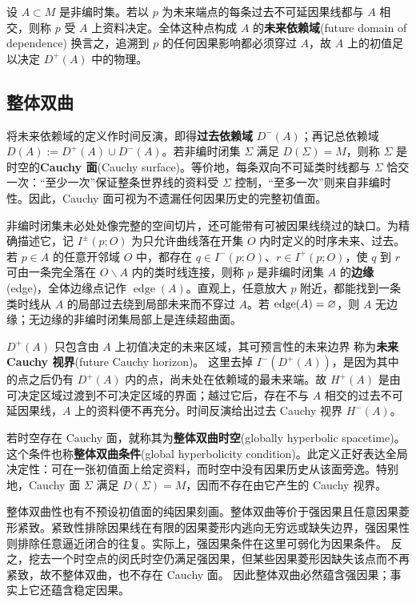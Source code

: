 设 $A\subset M$ 是非编时集。若以 $p$ 为未来端点的每条过去不可延因果线都与 $A$ 相交，则称 $p$ 受 $A$ 上资料决定。全体这种点构成 $A$ 的\textbf{未来依赖域}(future domain of dependence)
换言之，追溯到 $p$ 的任何因果影响都必须穿过 $A$，故 $A$ 上的初值足以决定 $D^+(A)$ 中的物理。

\subsection{整体双曲}

将未来依赖域的定义作时间反演，即得\textbf{过去依赖域} $D^-(A)$；再记总依赖域 $D(A):=D^+(A)\cup D^-(A)$。若非编时闭集 $\Sigma$ 满足 $D(\Sigma)=M$，则称 $\Sigma$ 是时空的\textbf{Cauchy 面}(Cauchy surface)。等价地，每条双向不可延类时线都与 $\Sigma$ 恰交一次：“至少一次”保证整条世界线的资料受 $\Sigma$ 控制，“至多一次”则来自非编时性。因此，Cauchy 面可视为不遗漏任何因果历史的完整初值面。

非编时闭集未必处处像完整的空间切片，还可能带有可被因果线绕过的缺口。为精确描述它，记 $I^\pm(p;O)$ 为只允许曲线落在开集 $O$ 内时定义的时序未来、过去。若 $p\in A$ 的任意开邻域 $O$ 中，都存在 $q\in I^-(p;O)$、$r\in I^+(p;O)$，使 $q$ 到 $r$ 可由一条完全落在 $O\backslash A$ 内的类时线连接，则称 $p$ 是非编时闭集 $A$ 的\textbf{边缘}(edge)，全体边缘点记作 $\operatorname{edge}(A)$。直观上，任意放大 $p$ 附近，都能找到一条类时线从 $A$ 的局部过去绕到局部未来而不穿过 $A$。若 $\operatorname{edge}(A)=\varnothing$，则 $A$ 无边缘；无边缘的非编时闭集局部上是连续超曲面。

$D^+(A)$ 只包含由 $A$ 上初值决定的未来区域，其可预言性的未来边界
称为\textbf{未来 Cauchy 视界}(future Cauchy horizon)。
这里去掉 $I^-(D^+(A))$，是因为其中的点之后仍有 $D^+(A)$ 内的点，尚未处在依赖域的最未来端。故 $H^+(A)$ 是由可决定区域过渡到不可决定区域的界面；越过它后，存在不与 $A$ 相交的过去不可延因果线，$A$ 上的资料便不再充分。时间反演给出过去 Cauchy 视界 $H^-(A)$。

若时空存在 Cauchy 面，就称其为\textbf{整体双曲时空}(globally hyperbolic spacetime)。这个条件也称\textbf{整体双曲条件}(global hyperbolicity condition)。此定义正好表达全局决定性：可在一张初值面上给定资料，而时空中没有因果历史从该面旁逸。特别地，Cauchy 面 $\Sigma$ 满足 $D(\Sigma)=M$，因而不存在由它产生的 Cauchy 视界。

整体双曲性也有不预设初值面的纯因果刻画。整体双曲等价于强因果且任意因果菱形紧致。紧致性排除因果线在有限的因果菱形内逃向无穷远或缺失边界，强因果性则排除任意逼近闭合的往复。实际上，强因果条件在这里可弱化为因果条件。
反之，挖去一个时空点的闵氏时空仍满足强因果，但某些因果菱形因缺失该点而不再紧致，故不整体双曲，也不存在 Cauchy 面。
因此整体双曲必然蕴含强因果；事实上它还蕴含稳定因果。

